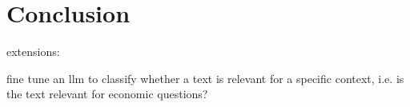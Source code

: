 \chapter{Conclusion}\label{sec4}
\thispagestyle{empty}

extensions:

fine tune an llm to classify whether a text is relevant for a specific context, i.e. is
the text relevant for economic questions?



\cleardoublepage

